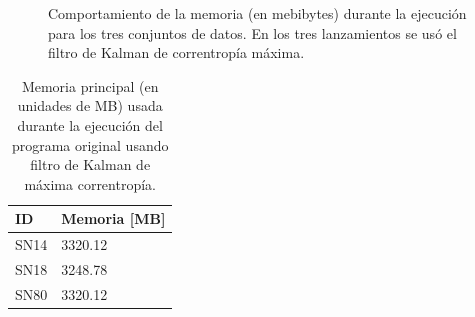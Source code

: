 \begin{figure}[h!]
\centering
{}\hfill
{}\vfill
{}
\caption{Comportamiento de la memoria (en mebibytes) durante la ejecuci\'on para los tres conjuntos de datos. En los tres lanzamientos se us\'o el filtro de Kalman de correntrop\'ia m\'axima.}
\label{fig:mem_mcc}
\end{figure}

\begin{table}
\centering
\begin{tabular}{|l|l|}
\hline
\textbf{ID} & Memoria [MB]\\\hline\hline
SN14 & 3320.12\\\hline
SN18 & 3248.78\\\hline
SN80 & 3320.12\\\hline
\end{tabular}
\caption{Memoria principal (en unidades de MB) usada durante la ejecuci\'on del programa original usando filtro de Kalman de m\'axima correntrop\'ia.}
\label{tab:mem2}
\end{table}

